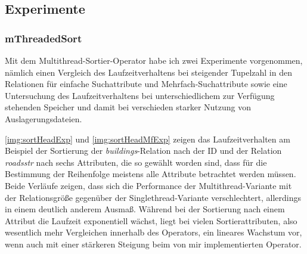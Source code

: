 \documentclass[a4paper,12pt,twoside]{article}
\newcommand{\Fb}[1]{\textit{#1}} %
\begin{document}
\subsection{Experimente}

\subsubsection{mThreadedSort}

Mit dem Multithread-Sortier-Operator habe ich zwei Experimente vorgenommen, nämlich einen Vergleich des Laufzeitverhaltens bei steigender Tupelzahl in den Relationen für einfache Suchattribute und Mehrfach-Suchattribute sowie eine Untersuchung des Laufzeitverhaltens bei unterschiedlichem zur Verfügung stehenden Speicher und damit bei verschieden starker Nutzung von Auslagerungsdateien.

\autoref{img:sortHeadExp} und \autoref{img:sortHeadMfExp} zeigen das Laufzeitverhalten am Beispiel der Sortierung der \Fb{buildings}-Relation nach der ID und der Relation \Fb{roads\-str} nach sechs Attributen, die so gewählt worden sind, dass für die Bestimmung der Reihenfolge meistens alle Attribute betrachtet werden müssen. Beide Verläufe zeigen, dass sich die Performance der Multithread-Variante mit der Relationsgröße gegenüber der Singlethread-Variante verschlechtert, allerdings in einem deutlich anderem Ausmaß. Während bei der Sortierung nach einem Attribut die Laufzeit exponentiell wächst, liegt bei vielen Sortierattributen, also wesentlich mehr Vergleichen innerhalb des Operators, ein lineares Wachstum vor, wenn auch mit einer stärkeren Steigung beim von mir implementierten Operator. 
\end{document}
